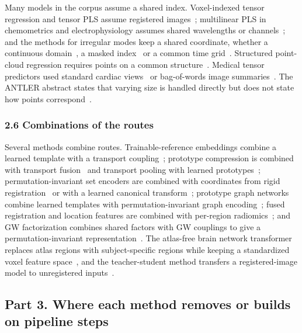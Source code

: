 \documentclass[journal,onecolumn]{IEEEtran}
\begin{document}
Many models in the corpus assume a shared index. Voxel-indexed tensor regression and tensor PLS assume registered images~\cite{Zhou2013Tensor,Guhaniyogi2017Bayesian,Li2017Parsimonious,Zhang2017Envelope,Spencer2024Bayesian}; multilinear PLS in chemometrics and electrophysiology assumes shared wavelengths or channels~\cite{Bro1996Multiway,Zhao2013HOPLS,MartinezMontes2004Concurrent}; and the methods for irregular modes keep a shared coordinate, whether a continuous domain~\cite{Tang2026Unaligned}, a masked index~\cite{Hu2026Ragged} or a common time grid~\cite{Xu2024Incomplete}. Structured point-cloud regression requires points on a common structure~\cite{Yan2019Structured}. Medical tensor predictors used standard cardiac views~\cite{Tripathi2023Tensor} or bag-of-words image summaries~\cite{Adeli2017Joint}. The ANTLER abstract states that varying size is handled directly but does not state how points correspond~\cite{Biehler2024ANTLER}.

\subsubsection{2.6 Combinations of the routes}

Several methods combine routes. Trainable-reference embeddings combine a learned template with a transport coupling~\cite{Mialon2021Trainable,Kolouri2021Wasserstein,VincentCuaz2022Template}; prototype compression is combined with transport fusion~\cite{Song2024Multimodal} and transport pooling with learned prototypes~\cite{Ren2025OTSurv}; permutation-invariant set encoders are combined with coordinates from rigid registration~\cite{Karimzadeh2026Revisiting} or with a learned canonical transform~\cite{GutierrezBecker2018MSPNet}; prototype graph networks combine learned templates with permutation-invariant graph encoding~\cite{Kwon2025Graph}; fused registration and location features are combined with per-region radiomics~\cite{Liu2023Coordinatized}; and GW factorization combines shared factors with GW couplings to give a permutation-invariant representation~\cite{Xu2023Representing}. The atlas-free brain network transformer replaces atlas regions with subject-specific regions while keeping a standardized voxel feature space~\cite{Huang2026Atlas}, and the teacher-student method transfers a registered-image model to unregistered inputs~\cite{Dong2024Self}.

\subsection{Part 3. Where each method removes or builds on pipeline steps}
\end{document}
